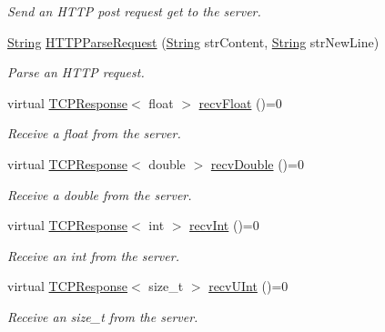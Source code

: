 \begin{DoxyCompactItemize}
\begin{DoxyCompactList}\small\item\em Send an H\+T\+TP post request get to the server. \end{DoxyCompactList}\item 
\mbox{\hyperlink{class_rad_j_a_v_1_1_string}{String}} \mbox{\hyperlink{class_rad_j_a_v_1_1_networking_1_1_tcpip_client_ae462f01cc5fbb9bfed9617857015002b}{H\+T\+T\+P\+Parse\+Request}} (\mbox{\hyperlink{class_rad_j_a_v_1_1_string}{String}} str\+Content, \mbox{\hyperlink{class_rad_j_a_v_1_1_string}{String}} str\+New\+Line)
\begin{DoxyCompactList}\small\item\em Parse an H\+T\+TP request. \end{DoxyCompactList}\item 
virtual \mbox{\hyperlink{class_rad_j_a_v_1_1_networking_1_1_t_c_p_response}{T\+C\+P\+Response}}$<$ float $>$ \mbox{\hyperlink{class_rad_j_a_v_1_1_networking_1_1_tcpip_client_acb02176a777a6f3dd05bf48c51e40c7b}{recv\+Float}} ()=0
\begin{DoxyCompactList}\small\item\em Receive a float from the server. \end{DoxyCompactList}\item 
virtual \mbox{\hyperlink{class_rad_j_a_v_1_1_networking_1_1_t_c_p_response}{T\+C\+P\+Response}}$<$ double $>$ \mbox{\hyperlink{class_rad_j_a_v_1_1_networking_1_1_tcpip_client_ab29ea3c5ca1efc4f2d21f724fbadf068}{recv\+Double}} ()=0
\begin{DoxyCompactList}\small\item\em Receive a double from the server. \end{DoxyCompactList}\item 
virtual \mbox{\hyperlink{class_rad_j_a_v_1_1_networking_1_1_t_c_p_response}{T\+C\+P\+Response}}$<$ int $>$ \mbox{\hyperlink{class_rad_j_a_v_1_1_networking_1_1_tcpip_client_a603ea8bc629629e78de34a9fed9ae762}{recv\+Int}} ()=0
\begin{DoxyCompactList}\small\item\em Receive an int from the server. \end{DoxyCompactList}\item 
virtual \mbox{\hyperlink{class_rad_j_a_v_1_1_networking_1_1_t_c_p_response}{T\+C\+P\+Response}}$<$ size\+\_\+t $>$ \mbox{\hyperlink{class_rad_j_a_v_1_1_networking_1_1_tcpip_client_a2ec8a72ae3c7098aec748b0faa233939}{recv\+U\+Int}} ()=0
\begin{DoxyCompactList}\small\item\em Receive an size\+\_\+t from the server. \end{DoxyCompactList}\item 

\end{DoxyCompactItemize}
